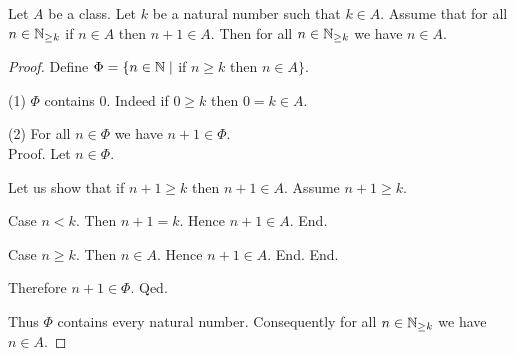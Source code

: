 \documentclass[../arithmetic.tex]{subfiles}
\begin{document}
  \begin{forthel}
    \begin{theorem}
      Let $A$ be a class.
      Let $k$ be a natural number such that $k \in A$.
      Assume that for all $n \in \mathbb{N}_{\geq k}$ if $n \in A$ then $n \plus 1 \in A$.
      Then for all $n \in \mathbb{N}_{\geq k}$ we have $n \in A$.
    \end{theorem}
    \begin{proof}
      Define $\Phi = \{n \in \mathbb{N} \mid$ if $n \geq k$ then $n \in A \}$.

      (1) $\Phi$ contains $0$.
      Indeed if $0 \geq k$ then $0 = k \in A$.

      (2) For all $n \in \Phi$ we have $n \plus 1 \in \Phi$. \\
      Proof.
        Let $n \in \Phi$.

        Let us show that if $n \plus 1 \geq k$ then $n \plus 1 \in A$.
          Assume $n \plus 1 \geq k$.

          Case $n \less k$.
            Then $n \plus 1 = k$.
            Hence $n \plus 1 \in A$.
          End.

          Case $n \geq k$.
            Then $n \in A$.
            Hence $n \plus 1 \in A$.
          End.
        End.

        Therefore $n \plus 1 \in \Phi$.
      Qed.

      Thus $\Phi$ contains every natural number.
      Consequently for all $n \in \mathbb{N}_{\geq k}$ we have $n \in A$.
    \end{proof}
  \end{forthel}
\end{document}
